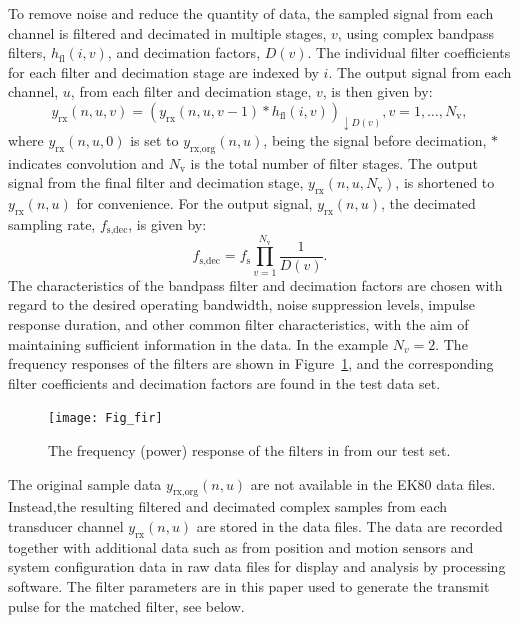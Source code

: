 \documentclass[preprint,12pt,TurnOnLineNumbers]{JASAnew}
\newcommand{\samplesymt}{n}
\newcommand{\genidxsym}{i}
\newcommand{\channelsym}{u}
\newcommand{\stagesym}{v}
\newcommand{\nstages}{N_{\textrm{v}}}
\newcommand{\fs}{f_{\textrm{s}}}
\newcommand{\fsdec}{f_{\textrm{s,dec}}}
\newcommand{\yrx}{y_{\textrm{rx}}}
\newcommand{\yrxorg}{y_{\textrm{rx,org}}}
\newcommand{\decfac}{D}
\newcommand{\hfl}{h_{\textrm{fl}}}
\begin{document}
To remove noise and reduce the quantity of data, the sampled signal from each channel is filtered and decimated in multiple stages, $\stagesym$, using complex bandpass filters, $\hfl(\genidxsym,\stagesym)$, and decimation factors, $\decfac(\stagesym)$. The individual filter coefficients for each filter and decimation stage are indexed by $i$. The output signal from each channel, $\channelsym$, from each filter and decimation stage, $\stagesym$, is then given by:
%
\begin{equation}
\label{eq:yrx}
\yrx(\samplesymt,\channelsym,\stagesym) = \left( \yrx(\samplesymt,\channelsym,\stagesym-1) * \hfl(\genidxsym,\stagesym) \right)_{\downarrow \decfac(\stagesym)}, 
\stagesym = 1,\ldots,\nstages,
\end{equation}
%
where $\yrx(\samplesymt,\channelsym,0)$ is set to $\yrxorg(\samplesymt,\channelsym)$, being the signal before decimation, $*$ indicates convolution and $\nstages$ is the total number of filter stages. The output signal from the final filter and decimation stage, $\yrx(\samplesymt,\channelsym,\nstages)$, is shortened to $\yrx(\samplesymt,\channelsym)$ for convenience. For the output signal, $\yrx(\samplesymt,\channelsym)$, the decimated sampling rate, $\fsdec$, is given by:
%
\begin{equation}
\label{eq:fsdec}
\fsdec = \fs\prod_{\stagesym=1}^{\nstages} \frac{1}{\decfac(\stagesym)}.
\end{equation}
%
The characteristics of the bandpass filter and decimation factors are chosen with regard to the desired operating bandwidth, noise suppression levels, impulse response duration, and other common filter characteristics, with the aim of maintaining sufficient information in the data. In the example $N_v=2$. The frequency responses of the filters are shown in Figure~\ref{fi:fir}, and the corresponding filter coefficients and decimation factors are found in the test data set.

\begin{figure}
\texttt{[image: Fig\_fir]}
\caption{\label{fi:fir} The frequency (power) response of the filters in from our test set.}
\end{figure}

The original sample data $\yrxorg(\samplesymt,\channelsym)$ are not available in the EK80 data files. Instead,the resulting filtered and decimated complex samples from each transducer channel $\yrx(\samplesymt,\channelsym)$ are stored in the data files. The data are recorded together with additional data such as from position and motion sensors and system configuration data in raw data files for display and analysis by processing software. The filter parameters are in this paper used to generate the transmit pulse for the matched filter, see below.
\end{document}
